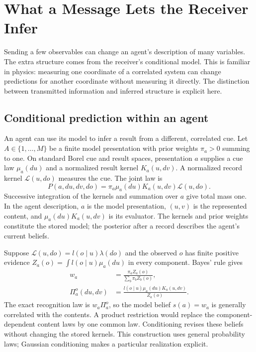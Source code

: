 \chapter{What a Message Lets the Receiver Infer}
\label{comp:communication}

Sending a few observables can change an agent's description of many variables. The extra structure comes from the receiver's conditional model. This is familiar in physics: measuring one coordinate of a correlated system can change predictions for another coordinate without measuring it directly. The distinction between transmitted information and inferred structure is explicit here.

\section{Conditional prediction within an agent}
\label{comp:conditional-prediction}

An agent can use its model to infer a result from a different, correlated cue. Let $A\in\{1,\ldots,M\}$ be a finite model presentation with prior weights $\pi_a>0$ summing to one. On standard Borel cue and result spaces, presentation $a$ supplies a cue law $\mu_a(du)$ and a normalized result kernel $K_a(u,dv)$. A normalized record kernel $\mathcal L(u,do)$ measures the cue. The joint law is
\begin{equation}
P(a,du,dv,do)=\pi_a\mu_a(du)K_a(u,dv)\mathcal L(u,do).
\label{comp:eq-cue-result-joint}
\end{equation}
Successive integration of the kernels and summation over $a$ give total mass one. In the agent description, $a$ is the model presentation, $(u,v)$ is the represented content, and $\mu_a(du)K_a(u,dv)$ is its evaluator. The kernels and prior weights constitute the stored model; the posterior after a record describes the agent's current beliefs.

Suppose $\mathcal L(u,do)=l(o\mid u)\lambda(do)$ and the observed $o$ has finite positive evidence $Z_a(o)=\int l(o\mid u)\mu_a(du)$ in every component. Bayes' rule gives
\begin{equation}
\begin{aligned}
w_a&=\frac{\pi_aZ_a(o)}{\sum_b\pi_bZ_b(o)},\\
\Pi_a^o(du,dv)&=\frac{l(o\mid u)\mu_a(du)K_a(u,dv)}{Z_a(o)}.
\end{aligned}
\label{comp:eq-cue-result-posterior}
\end{equation}
The exact recognition law is $w_a\Pi_a^o$, so the model belief $s(a)=w_a$ is generally correlated with the contents. A product restriction would replace the component-dependent content laws by one common law. Conditioning revises these beliefs without changing the stored kernels. This construction uses general probability laws; Gaussian conditioning makes a particular realization explicit.

